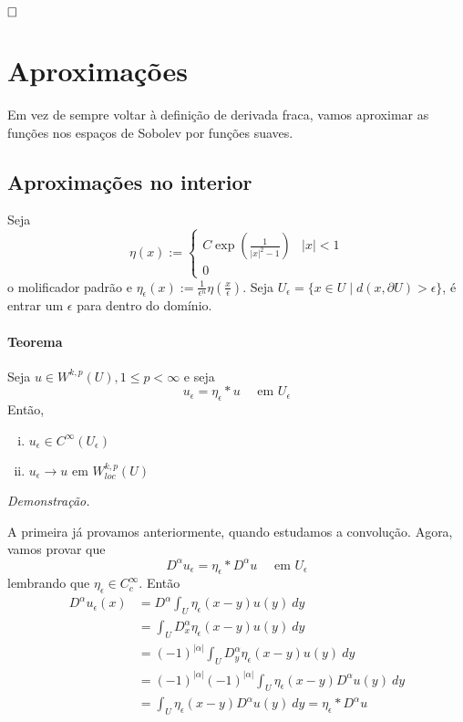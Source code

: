 \documentclass[a4paper, 11pt]{book}
\newcommand{\qed}{$\hfill\square$}
\newcommand{\p}{\partial}
\newcommand{\e}{\epsilon}
\begin{document}
\qed







\section{Aproximações}

Em vez de sempre voltar à definição de derivada fraca, vamos aproximar as funções nos espaços de Sobolev por funções suaves.

\subsection{Aproximações no interior}

Seja \[ \eta(x):= \begin{cases}
	C \exp\left(\frac{1}{|x|^2-1}\right) & |x|<1\\
	0
\end{cases} \] o molificador padrão e \( \eta_\e(x):= \frac{1}{\e^n}\eta\left(\frac{x}{\e}\right) \). Seja \( U_\e = \{x \in U \mid d(x, \p U) > \e\} \), é entrar um \( \e \) para dentro do domínio.

\paragraph{Teorema} Seja \( u \in W^{k,p}(U), 1 \leq p < \infty \) e seja \[ u_\e = \eta_\e * u\quad  \text{ em } U_\e\] Então, \begin{enumerate}[(i)]
	\item \( u_\e \in C^\infty(U_\e) \)
	\item \( u_\e \rightarrow u \) em \( W^{k,p}_{loc}(U) \)
\end{enumerate}

\textit{Demonstração.}

A primeira já provamos anteriormente, quando estudamos a convolução. Agora, vamos provar que \[ D^\alpha u_\e = \eta_\e * D^\alpha u \quad \text{ em } U_\e\] lembrando que \( \eta_\e \in C^\infty_c \). Então \begin{align*}
	D^\alpha u_\e(x) &= D^\alpha \int_U \eta_\e(x-y) u(y)\ dy\\
	&=  \int_U D^\alpha_x \eta_\e(x-y) u(y)\ dy\\
	&=  (-1)^{|\alpha|} \int_U D^\alpha_y \eta_\e(x-y) u(y)\ dy\\
	&= (-1)^{|\alpha|}(-1)^{|\alpha|}  \int_U \eta_\e(x-y) D^\alpha u(y)\ dy\\
	&=  \int_U \eta_\e(x-y) D^\alpha u(y)\ dy = \eta_\e * D^\alpha u
\end{align*}
\end{document}
